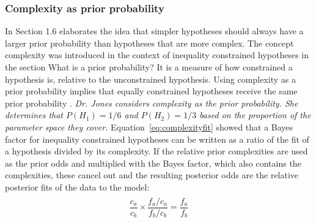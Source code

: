 \documentclass[man]{apa6}
\begin{document}
\subsubsection{Complexity as prior probability}
In Section 1.6  elaborates the idea that simpler hypotheses should always have a larger prior probability than hypotheses that are more complex.
The concept complexity was introduced in the context of inequality constrained hypotheses in the section What is a prior probability? 
It is a measure of how constrained a hypothesis is, relative to the unconstrained hypothesis.
Using complexity as a prior probability implies that equally constrained hypotheses receive the same prior probability \cite{scott10}.
\textit{Dr. Jones considers complexity as the prior probability.
		She determines that $P(H_1) = 1/6$ and $P(H_2) = 1/3$ based on the proportion of the parameter space they cover.}
Equation~\ref{eq:complexityfit} showed that a Bayes factor for inequality constrained hypotheses can be written as a ratio of the fit of a hypothesis divided by its complexity.
If the relative prior complexities are used as the prior odds and multiplied with the Bayes factor, which also contains the complexities, these cancel out and the resulting posterior odds are the relative posterior fits of the data to the model:
\begin{align}
\label{eq:nocomplexity}
\begin{split}
\dfrac{c_a}{c_b} \times \dfrac{f_a/c_a}{f_b/c_b} = \dfrac{f_a}{f_b}
\end{split}
\end{align}
\end{document}
